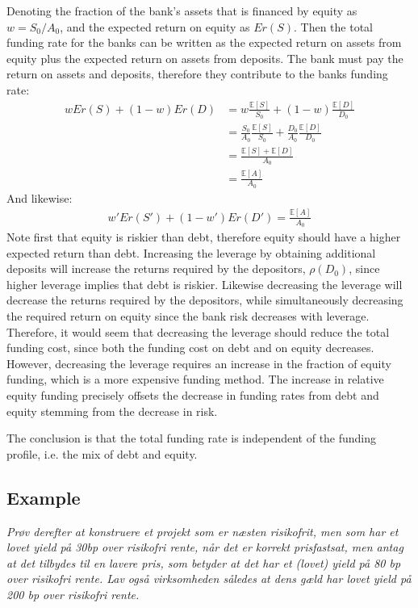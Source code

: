 \documentclass[10pt,a4paper]{article}
\begin{document}
        Denoting the fraction of the bank's assets that is financed by equity as $w = S_{0} / A_{0}$, and the expected return on equity as $Er(S)$. Then the total funding rate for the banks can be written as the expected return on assets from equity plus the expected return on assets from deposits. The bank must pay the return on assets and deposits, therefore they contribute to the banks funding rate:
            \begin{align}
                wEr(S) + (1-w)Er(D) 
                    &= w \frac{\mathbb{E}\left[S\right]}{S_{0}} + (1-w)\frac{\mathbb{E}\left[D\right]}{D_{0}} \\ 
                    &= \frac{S_{0}}{A_{0}} \frac{\mathbb{E}\left[S\right]}{S_{0}} + \frac{D_{0}}{A_{0}} \frac{\mathbb{E}\left[D\right]}{D_{0}} \\ 
                    &= \frac{\mathbb{E}\left[S\right] + \mathbb{E}\left[D\right]}{A_{0}} \\
                    &= \frac{\mathbb{E}\left[A\right]}{A_{0}}
            \end{align}
        And likewise:
            \begin{align}
                w'Er(S') + (1-w')Er(D') = \frac{\mathbb{E}\left[A\right]}{A_{0}}
            \end{align}
        Note first that equity is riskier than debt, therefore equity should have a higher expected return than debt. Increasing the leverage by obtaining additional deposits will increase the returns required by the depositors, $\rho(D_{0})$, since higher leverage implies that debt is riskier. Likewise decreasing the leverage will decrease the returns required by the depositors, while simultaneously decreasing the required return on equity since the bank risk decreases with leverage. Therefore, it would seem that decreasing the leverage should reduce the total funding cost, since both the funding cost on debt and on equity decreases. However, decreasing the leverage requires an increase in the fraction of equity funding, which is a more expensive funding method. The increase in relative equity funding precisely offsets the decrease in funding rates from debt and equity stemming from the decrease in risk. 

        The conclusion is that the total funding rate is independent of the funding profile, i.e. the mix of debt and equity. 

    \subsection{Example}
        \textit{Prøv derefter at konstruere et projekt som er næsten risikofrit, men som har et lovet yield på 30bp over risikofri rente, når det er korrekt prisfastsat, men antag at det tilbydes til en lavere pris, som betyder at det har et (lovet) yield på 80 bp over risikofri rente. Lav også virksomheden således at dens gæld har lovet yield på 200 bp over risikofri rente.}
\end{document}

